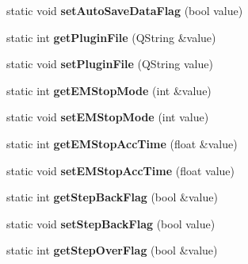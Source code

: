 \begin{DoxyCompactItemize}
\item 
\hypertarget{classAppConf_a14408c21aff288d62723ae89148ee903}{static void {\bfseries set\-Auto\-Save\-Data\-Flag} (bool value)}\label{classAppConf_a14408c21aff288d62723ae89148ee903}

\item 
\hypertarget{classAppConf_a41647fc637fd209587d08d7affff5478}{static int {\bfseries get\-Plugin\-File} (Q\-String \&value)}\label{classAppConf_a41647fc637fd209587d08d7affff5478}

\item 
\hypertarget{classAppConf_aa6026c6e73c915d0913788ec8e5c163f}{static void {\bfseries set\-Plugin\-File} (Q\-String value)}\label{classAppConf_aa6026c6e73c915d0913788ec8e5c163f}

\item 
\hypertarget{classAppConf_a6df73ebfe3d2397b96c4ba6ff129c824}{static int {\bfseries get\-E\-M\-Stop\-Mode} (int \&value)}\label{classAppConf_a6df73ebfe3d2397b96c4ba6ff129c824}

\item 
\hypertarget{classAppConf_a119e30b208cdcd591ca3aabd574d5fe2}{static void {\bfseries set\-E\-M\-Stop\-Mode} (int value)}\label{classAppConf_a119e30b208cdcd591ca3aabd574d5fe2}

\item 
\hypertarget{classAppConf_a07a3bfd723c2ad636cbd351f1334b825}{static int {\bfseries get\-E\-M\-Stop\-Acc\-Time} (float \&value)}\label{classAppConf_a07a3bfd723c2ad636cbd351f1334b825}

\item 
\hypertarget{classAppConf_ad019fd21561d0c2ff59ca7a6d4153cce}{static void {\bfseries set\-E\-M\-Stop\-Acc\-Time} (float value)}\label{classAppConf_ad019fd21561d0c2ff59ca7a6d4153cce}

\item 
\hypertarget{classAppConf_a5a0ced6e5939aade5999ef035bd824f8}{static int {\bfseries get\-Step\-Back\-Flag} (bool \&value)}\label{classAppConf_a5a0ced6e5939aade5999ef035bd824f8}

\item 
\hypertarget{classAppConf_af04ff9deacb91304f7fe00083c874374}{static void {\bfseries set\-Step\-Back\-Flag} (bool value)}\label{classAppConf_af04ff9deacb91304f7fe00083c874374}

\item 
\hypertarget{classAppConf_aa8380c435d2fc9779c8d0951380bab6b}{static int {\bfseries get\-Step\-Over\-Flag} (bool \&value)}\label{classAppConf_aa8380c435d2fc9779c8d0951380bab6b}


\end{DoxyCompactItemize}
